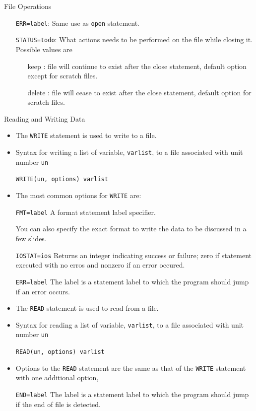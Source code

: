 \documentclass[c,mathserif,compress,xcolor=svgnames]{beamer}
\newcommand{\lstfortran}[1]{\lstinline[language={[90]Fortran},basicstyle=\footnotesize\ttfamily]|#1|}
\begin{document}
\begin{frame}{File Operations}
\begin{itemize}
    \item[] \lstfortran{ERR=label}: Same use as \lstfortran{open} statement.
    \item[] \lstfortran{STATUS=todo}: What actions needs to be performed on the file while closing it. Possible values are
      \begin{itemize}
        \item[keep]: file will continue to exist after the close statement, default option except for scratch files.
        \item[delete]: file will cease to exist after the close statement, default option for scratch files.
      \end{itemize}
  \end{itemize}
\end{frame}

\begin{frame}{Reading and Writing Data}
  \begin{itemize}
    \item The \lstfortran{WRITE} statement is used to write to a file.
    \item Syntax for writing a list of variable, \lstfortran{varlist}, to a file associated with unit number \lstfortran{un} 
    \item[] \lstfortran{WRITE(un, options) varlist}
    \item The most common options for \lstfortran{WRITE} are:
    \item[] \lstfortran{FMT=label} A format statement label specifier.
    \item[] You can also specify the exact format to write the data to be discussed in a few slides.
    \item[] \lstfortran{IOSTAT=ios} Returns an integer indicating success or failure; zero if statement executed with no erros and nonzero if an error occured.
    \item[] \lstfortran{ERR=label} The label is a statement label to which the program should jump if an error occurs.
    \item The \lstfortran{READ} statement is used to read from a file.
    \item Syntax for reading a list of variable, \lstfortran{varlist}, to a file associated with unit number \lstfortran{un}
    \item[] \lstinline[language={[90]Fortran}]|READ(un, options) varlist|
    \item Options to the \lstfortran{READ} statement are the same as that of the \lstfortran{WRITE} statement with one additional option,
    \item[] \lstfortran{END=label} The label is a statement label to which the program should jump if the end of file is detected.
  \end{itemize}
\end{frame}
\end{document}

